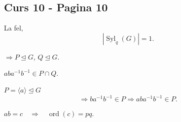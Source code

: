 
\subsection*{Curs 10 - Pagina 10}

\noindent La fel,
\[
|\operatorname{Syl}_q(G)|=1.
\]

\noindent $\Longrightarrow P\trianglelefteq G$, $Q\trianglelefteq G$.

\medskip
\noindent $aba^{-1}b^{-1}\in P\cap Q$.

\medskip
\noindent $P=\langle a\rangle\trianglelefteq G$
\[
\Longrightarrow ba^{-1}b^{-1}\in P
\Longrightarrow aba^{-1}b^{-1}\in P.
\]

\noindent $ab=c\quad\Longrightarrow\quad\operatorname{ord}(c)=pq$.

